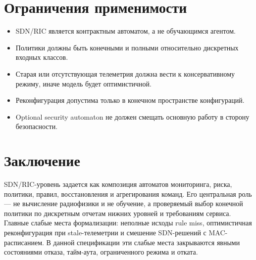 \documentclass[10pt,a4paper]{article}
\begin{document}
\section{Ограничения применимости}

\begin{itemize}
  \item SDN/RIC является контрактным автоматом, а не обучающимся агентом.
  \item Политики должны быть конечными и полными относительно дискретных входных классов.
  \item Старая или отсутствующая телеметрия должна вести к консервативному режиму, иначе модель будет оптимистичной.
  \item Реконфигурация допустима только в конечном пространстве конфигураций.
  \item Optional security automaton не должен смещать основную работу в сторону безопасности.
\end{itemize}

\section{Заключение}

SDN/RIC-уровень задается как композиция автоматов мониторинга, риска, политики, правил, восстановления и агрегирования команд. Его центральная роль --- не вычисление радиофизики и не обучение, а проверяемый выбор конечной политики по дискретным отчетам нижних уровней и требованиям сервиса. Главные слабые места формализации: неполные исходы rule miss, оптимистичная реконфигурация при stale-телеметрии и смешение SDN-решений с MAC-расписанием. В данной спецификации эти слабые места закрываются явными состояниями отказа, тайм-аута, ограниченного режима и отката.
\end{document}
